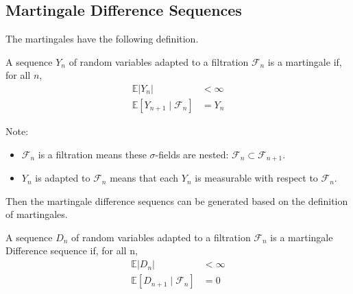 \subsection{Martingale Difference Sequences}

The martingales have the following definition.

\begin{definition} \cite*{Bartlett:2020}
  A sequence $Y_n$ of random variables adapted to a filtration $\mathcal{F}_n$ is a martingale if, for all $n$,
  \begin{equation}
    \begin{aligned}
    \mathbb{E}\left|Y_{n}\right| &<\infty \\
    \mathbb{E}\left[Y_{n+1} \mid \mathcal{F}_{n}\right] &=Y_{n}
    \end{aligned}
  \end{equation}
\end{definition}

Note:

\begin{itemize}
  \item $\mathcal{F}_{n}$ is a filtration means these $\sigma$-fields are nested: $\mathcal{F}_{n} \subset \mathcal{F}_{n+1}$.
  \item $Y_n$ is adapted to $\mathcal{F}_{n}$ means  that each $Y_n$ is measurable with respect to $\mathcal{F}_n$.
\end{itemize}

Then the martingale difference sequencs can be generated based on the definition of martingales.

\begin{definition} \cite*{Bartlett:2020}
  A sequence $D_n$ of random variables adapted to a filtration $\mathcal{F}_n$ is a martingale Difference sequence if, for all n,
  \begin{equation}
    \begin{aligned}
    \mathbb{E}\left|D_{n}\right| &<\infty \\
    \mathbb{E}\left[D_{n+1} \mid \mathcal{F}_{n}\right] &=0
    \end{aligned}
  \end{equation}
\end{definition}

